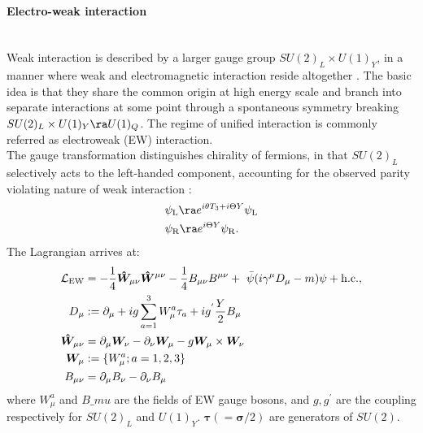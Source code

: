 \paragraph{Electro-weak interaction} \mbox{} \\
Weak interaction is described by a larger gauge group $SU(2)_L \times U(1)_Y$, in a manner where weak and electromagnetic interaction reside altogether \cite{WeakGlashow,WeakWeinberg,WeakSalam}. 
The basic idea is that they share the common origin at high energy scale and branch into separate interactions at some point through a spontaneous symmetry breaking $SU(2)_L \times U(1)_Y \ra U(1)_Q$.
The regime of unified interaction is commonly referred as electroweak (EW) interaction. \\

The gauge transformation distinguishes chirality of fermions, in that $SU(2)_L$ selectively acts to the left-handed component, 
accounting for the observed parity violating nature of weak interaction \cite{PVLeeYang,PVWu}:
\begin{align}
& \psi_{\mL} \ra e^{i\theta T_3+i\Theta Y} \psi_{\mL}   \\
& \psi_{\mR} \ra e^{i\Theta Y} \psi_{\mR}.
\end{align}
The Lagrangian arrives at:
\begin{align}
\mathcal{L}_{\mathrm{EW}} & = -\frac{1}{4} \bm{\hat{W}}_{\mu\nu} \bm{\hat{W}}^{\mu\nu}-\frac{1}{4}B_{\mu\nu} B^{\mu\nu} + \,\, \bar{\psi}(i \gamma^\mu D_\mu - m) \psi + \mathrm{h.c.}, \nn \\
%
D_\mu & := \partial_\mu + ig \sum_{a=1}^3 W^a_{\mu} \tau_a  + ig^{'} \frac{Y}{2} B_\mu \nn \\
\bm{\hat{W}}_{\mu\nu} & = \partial_\mu \bm{W}_\nu - \partial_\nu \bm{W}_\mu - g \bm{W}_\mu \times \bm{W}_\nu \nn \\
\bm{W}_\mu & := \{W^a_\mu; a=1,2,3\} \nn \\
B_{\mu\nu} & = \partial_\mu B_\nu - \partial_\nu B_\mu
\label{eq::EWLag1}
\end{align}
where $W^a_\mu$ and $B\_mu$ are the fields of EW gauge bosons, and $g, g^{'}$ are the coupling respectively for $SU(2)_L$ and $U(1)_Y$. $\bm{\tau} (= \bm{\sigma}/2)$ are generators of $SU(2)$. \\


